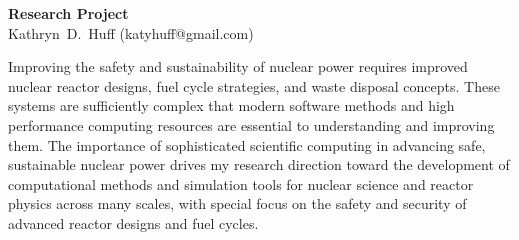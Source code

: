 \documentclass[a4paper, 10pt]{article}
\makeatletter
\newcommand{\authorname}{Kathryn~D.~Huff }
\newcommand{\authoremail}{katyhuff@gmail.com}
\newcommand{\authorsite}{katyhuff.github.com}
\makeatother
\begin{document}
\pagestyle{fancy}
\lhead{\textcolor{gray}{\it \authorname}}
\rhead{\textcolor{gray}{\thepage/\totalpages{}}}
\renewcommand{\headrulewidth}{0pt} 
\renewcommand{\footrulewidth}{0pt} 
\fancyfoot[C]{\footnotesize \textcolor{gray}{\authorsite}} 

\begin{center}
{\LARGE \bf Research Project}\\
\vspace*{0.1cm}
{\normalsize \authorname (\authoremail)}
\end{center}




Improving the safety and sustainability of nuclear power requires improved 
nuclear reactor designs, fuel cycle strategies, and waste disposal concepts.  
These systems are sufficiently complex that modern software methods and 
high performance computing resources are essential to understanding and 
improving them. The importance of sophisticated scientific computing in 
advancing safe, sustainable nuclear power drives my research direction toward 
the development of computational methods and simulation tools for nuclear 
science and  reactor physics across many scales, with special focus on the 
safety and security of advanced reactor designs and fuel cycles.
\end{document}
